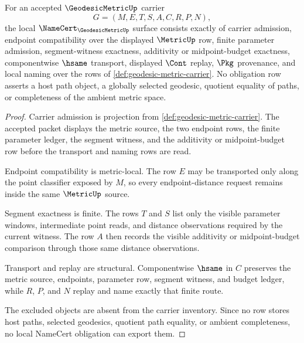 \begin{theorem}
\label{thm:geodesic-metric-namecert-obligations}
For an accepted $\GeodesicMetricUp$ carrier
$$
G=(M,E,T,S,A,C,R,P,N),
$$
the local $\NameCert_{\GeodesicMetricUp}$ surface consists exactly of carrier admission, endpoint compatibility over the displayed $\MetricUp$ row, finite parameter admission, segment-witness exactness, additivity or midpoint-budget exactness, componentwise $\hsame$ transport, displayed $\Cont$ replay, $\Pkg$ provenance, and local naming over the rows of \autoref{def:geodesic-metric-carrier}. No obligation row asserts a host path object, a globally selected geodesic, quotient equality of paths, or completeness of the ambient metric space.
\end{theorem}
\begin{proof}
Carrier admission is projection from \autoref{def:geodesic-metric-carrier}. The accepted packet displays the metric source, the two endpoint rows, the finite parameter ledger, the segment witness, and the additivity or midpoint-budget row before the transport and naming rows are read.

Endpoint compatibility is metric-local. The row $E$ may be transported only along the point classifier exposed by $M$, so every endpoint-distance request remains inside the same $\MetricUp$ source.

Segment exactness is finite. The rows $T$ and $S$ list only the visible parameter windows, intermediate point reads, and distance observations required by the current witness. The row $A$ then records the visible additivity or midpoint-budget comparison through those same distance observations.

Transport and replay are structural. Componentwise $\hsame$ in $C$ preserves the metric source, endpoints, parameter row, segment witness, and budget ledger, while $R$, $P$, and $N$ replay and name exactly that finite route.

The excluded objects are absent from the carrier inventory. Since no row stores host paths, selected geodesics, quotient path equality, or ambient completeness, no local NameCert obligation can export them.
\end{proof}

